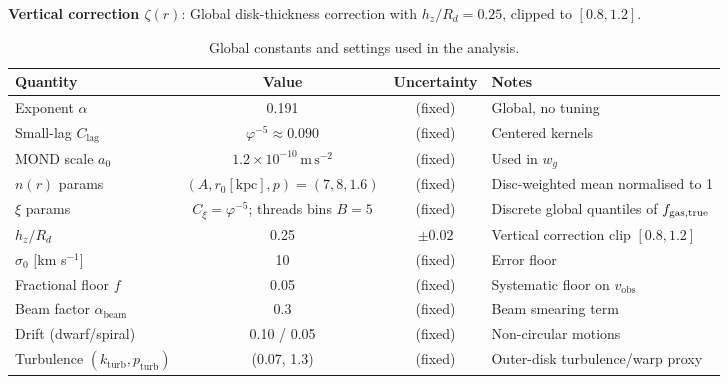 \documentclass[12pt,a4paper]{article}
\begin{document}
\textbf{Vertical correction $\zeta(r)$}: Global disk-thickness correction with $h_z/R_d = 0.25$, clipped to $[0.8, 1.2]$.

\begin{table}[h]
\centering
\caption{Global constants and settings used in the analysis.}
\label{tab:parameters}
\begin{tabular}{l c c l}
\toprule
Quantity & Value & Uncertainty & Notes \\
\midrule
Exponent $\alpha$ & 0.191 & (fixed) & Global, no tuning \\
Small-lag $C_\mathrm{lag}$ & $\varphi^{-5} \approx 0.090$ & (fixed) & Centered kernels \\
MOND scale $a_0$ & $1.2\times10^{-10}\,\mathrm{m\,s^{-2}}$ & (fixed) & Used in $w_g$ \\
$n(r)$ params & $(A, r_0[\mathrm{kpc}], p)=(7,8,1.6)$ & (fixed) & Disc-weighted mean normalised to 1 \\
$\xi$ params & $C_\xi=\varphi^{-5}$; threads bins $B{=}5$ & (fixed) & Discrete global quantiles of $f_{\rm gas,true}$ \\
$h_z/R_d$ & 0.25 & $\pm 0.02$ & Vertical correction clip $[0.8,1.2]$ \\
$\sigma_0$ [km s$^{-1}$] & 10 & (fixed) & Error floor \\
Fractional floor $f$ & 0.05 & (fixed) & Systematic floor on $v_\mathrm{obs}$ \\
Beam factor $\alpha_\mathrm{beam}$ & 0.3 & (fixed) & Beam smearing term \\
Drift (dwarf/spiral) & 0.10 / 0.05 & (fixed) & Non-circular motions \\
Turbulence $(k_\mathrm{turb},p_\mathrm{turb})$ & (0.07, 1.3) & (fixed) & Outer-disk turbulence/warp proxy \\
\bottomrule
\end{tabular}
\end{table}
\end{document}
